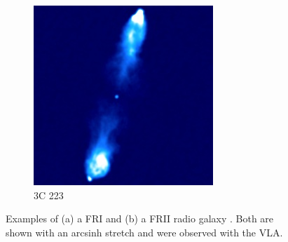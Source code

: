 \begin{figure}
\begin{subfigure}{0.45\textwidth}
                \includegraphics[width=\textwidth]{images/3C_223.jpg}
                \caption{3C 223}
                \label{fig:3C223}
            \end{subfigure}
            \caption[Examples of a FRI and a FRII radio galaxy.]{\label{fig:fri-frii} Examples of (a) a FRI \citep{laing_rotation_1987} and (b) a FRII radio galaxy \citep{leahy_vla_1991}. Both are shown with an arcsinh stretch and were observed with the VLA.}
        \end{figure}

